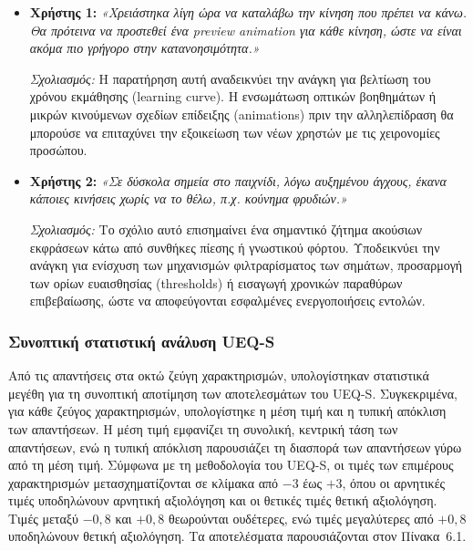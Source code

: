 \documentclass[twoside, a4paper, 11pt]{article}
\newcommand{\textlatin}[1]{\textenglish{#1}}
\begin{document}
\begin{itemize}
    \item \textbf{Χρήστης 1:} \textit{«Χρειάστηκα λίγη ώρα να καταλάβω την κίνηση που πρέπει να κάνω. Θα πρότεινα να προστεθεί ένα \textlatin{preview animation} για κάθε κίνηση, ώστε να είναι ακόμα πιο γρήγορο στην κατανοησιμότητα.»} 
    \par\noindent
    \textit{Σχολιασμός:} Η παρατήρηση αυτή αναδεικνύει την ανάγκη για βελτίωση του χρόνου εκμάθησης (\textlatin{learning curve}). Η ενσωμάτωση οπτικών βοηθημάτων ή μικρών κινούμενων σχεδίων επίδειξης (\textlatin{animations}) πριν την αλληλεπίδραση θα μπορούσε να επιταχύνει την εξοικείωση των νέων χρηστών με τις χειρονομίες προσώπου.
    
    \item \textbf{Χρήστης 2:} \textit{«Σε δύσκολα σημεία στο παιχνίδι, λόγω αυξημένου άγχους, έκανα κάποιες κινήσεις χωρίς να το θέλω, π.χ. κούνημα φρυδιών.»} 
    \par\noindent
    \textit{Σχολιασμός:} Το σχόλιο αυτό επισημαίνει ένα σημαντικό ζήτημα ακούσιων εκφράσεων κάτω από συνθήκες πίεσης ή γνωστικού φόρτου. Υποδεικνύει την ανάγκη για ενίσχυση των μηχανισμών φιλτραρίσματος των σημάτων, προσαρμογή των ορίων ευαισθησίας (\textlatin{thresholds}) ή εισαγωγή χρονικών παραθύρων επιβεβαίωσης, ώστε να αποφεύγονται εσφαλμένες ενεργοποιήσεις εντολών.
\end{itemize}

\subsubsection{Συνοπτική στατιστική ανάλυση UEQ-S}

Από τις απαντήσεις στα οκτώ ζεύγη χαρακτηρισμών, υπολογίστηκαν στατιστικά μεγέθη για τη συνοπτική αποτίμηση των αποτελεσμάτων του \textlatin{UEQ-S}. Συγκεκριμένα, για κάθε ζεύγος χαρακτηρισμών, υπολογίστηκε η μέση τιμή και η τυπική απόκλιση των απαντήσεων. Η μέση τιμή εμφανίζει τη συνολική, κεντρική τάση των απαντήσεων, ενώ η τυπική απόκλιση παρουσιάζει τη διασπορά των απαντήσεων γύρω από τη μέση τιμή. Σύμφωνα με τη μεθοδολογία του \textlatin{UEQ-S}, οι τιμές των επιμέρους χαρακτηρισμών μετασχηματίζονται σε κλίμακα από $-3$ έως $+3$, όπου οι αρνητικές τιμές υποδηλώνουν αρνητική αξιολόγηση και οι θετικές τιμές θετική αξιολόγηση. Τιμές μεταξύ $-0,8$ και $+0,8$ θεωρούνται ουδέτερες, ενώ τιμές μεγαλύτερες από $+0,8$ υποδηλώνουν θετική αξιολόγηση. Τα αποτελέσματα παρουσιάζονται στον Πίνακα~6.1.
\end{document}
